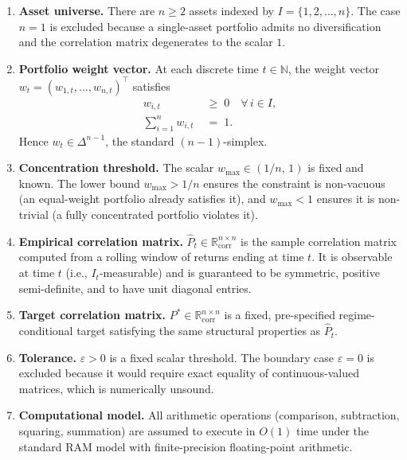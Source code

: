 \documentclass[12pt,openany]{book}
\newcommand{\R}{\mathbb{R}}
\newcommand{\bfw}{\mathbf{w}}
\numberwithin{equation}{chapter}
\theoremstyle{plain}
\theoremstyle{definition}
\theoremstyle{remark}
\def\mathcal#1{#1}%
\def\bfw{w}%
\begin{document}
\begin{enumerate}
  \item \textbf{Asset universe.}
        There are $n \geq 2$ assets indexed by
        $\mathcal{I} = \{1, 2, \ldots, n\}$.
        The case $n = 1$ is excluded because a single-asset portfolio
        admits no diversification and the correlation matrix degenerates
        to the scalar $1$.

  \item \textbf{Portfolio weight vector.}
        At each discrete time $t \in \mathbb{N}$, the weight vector
        $\bfw_t = (w_{1,t}, \ldots, w_{n,t})^{\top}$ satisfies
        \begin{align}
          w_{i,t} &\;\geq\; 0
          \quad \forall\, i \in \mathcal{I},
          \label{eq:weight-nonneg}\\
          \sum_{i=1}^{n} w_{i,t} &\;=\; 1.
          \label{eq:weight-sum}
        \end{align}
        Hence $\bfw_t \in \Delta^{n-1}$, the standard $(n-1)$-simplex.

  \item \textbf{Concentration threshold.}
        The scalar $w_{\max} \in (1/n,\, 1)$ is fixed and known.
        The lower bound $w_{\max} > 1/n$ ensures the constraint is
        non-vacuous (an equal-weight portfolio already satisfies it),
        and $w_{\max} < 1$ ensures it is non-trivial (a fully
        concentrated portfolio violates it).

  \item \textbf{Empirical correlation matrix.}
        $\hat{P}_t \in \R^{n \times n}_{\mathrm{corr}}$ is the sample
        correlation matrix computed from a rolling window of returns
        ending at time $t$.  It is observable at time $t$ (i.e.,
        $\mathcal{I}_t$-measurable) and is guaranteed to be symmetric,
        positive semi-definite, and to have unit diagonal entries.

  \item \textbf{Target correlation matrix.}
        $P^* \in \R^{n \times n}_{\mathrm{corr}}$ is a fixed,
        pre-specified regime-conditional target satisfying the same
        structural properties as $\hat{P}_t$.

  \item \textbf{Tolerance.}
        $\varepsilon > 0$ is a fixed scalar threshold.  The boundary
        case $\varepsilon = 0$ is excluded because it would require
        exact equality of continuous-valued matrices, which is
        numerically unsound.

  \item \textbf{Computational model.}
        All arithmetic operations (comparison, subtraction, squaring,
        summation) are assumed to execute in $O(1)$ time under the
        standard RAM model with finite-precision floating-point
        arithmetic.
\end{enumerate}
\end{document}
